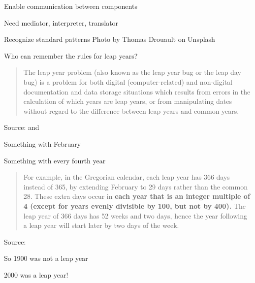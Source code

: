 \documentclass[Screen16to9,17pt]{foils}
\begin{document}



\begin{list2}
\item Enable communication between components
\item Need mediator, interpreter, translator
\item Recognize standard patterns \hfill Photo by Thomas Drouault on Unsplash
\end{list2}



Who can remember the rules for leap years?

\begin{quote}
The leap year problem (also known as the leap year bug or the leap day bug) is a problem for both digital (computer-related) and non-digital documentation and data storage situations which results from errors in the calculation of which years are leap years, or from manipulating dates without regard to the difference between leap years and common years.
\end{quote}
Source:  and

\begin{list2}
\item Something with February
\item Something with every fourth year
\end{list2}



\begin{quote}
For example, in the Gregorian calendar, each leap year has 366 days instead of 365, by extending February to 29 days rather than the common 28. These extra days occur in {\bf each year that is an integer multiple of 4 (except for years evenly divisible by 100, but not by 400).} The leap year of 366 days has 52 weeks and two days, hence the year following a leap year will start later by two days of the week.
\end{quote}
Source: 

\begin{list2}
\item So 1900 was not a leap year
\item 2000 was a leap year!
\end{list2}
\end{document}

